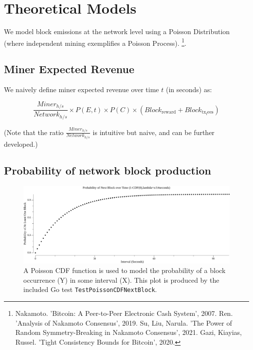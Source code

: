 \documentclass[11pt]{article}
\theoremstyle{plain}
\begin{document}

\pagebreak
\section{\normalsize{Theoretical Models}}\label{sec: theoretical-models}

We model block emissions at the network level using a Poisson Distribution
(where independent mining exemplifies a Poisson Process).\nolinebreak
\footnote{
    Nakamoto. 'Bitcoin: A Peer-to-Peer Electronic Cash System', 2007.
    Ren. 'Analysis of Nakamoto Consensus', 2019.
    Su, Liu, Narula. 'The Power of Random Symmetry-Breaking in Nakamoto Consensus', 2021.
    Gazi, Kiayias, Russel. 'Tight Consistency Bounds for Bitcoin', 2020.
}.

\subsection{\normalsize{Miner Expected Revenue}}

We naively define miner expected revenue over time $t$ (in seconds) as:

\newcommand{\minerHashrate}{Miner_{h/s}}
\newcommand{\networkHashrate}{Network_{h/s}}
\newcommand{\blockReward}{Block_\mathrm{reward}}
\newcommand{\blockTransactionFees}{Block_\mathrm{tx_fees}}

\begin{equation}
\frac{\minerHashrate}{\networkHashrate}
\times
P(E,t)
\times
P(C)
\times
(\blockReward + \blockTransactionFees)
\end{equation}

(Note that the ratio $\frac{\minerHashrate}{\networkHashrate}$ is intuitive but
naive, and can be further developed.)

\subsection{\normalsize{Probability of network block production}}

\begin{figure}[htp]
    \label{go-block-step-cdf-interval}
    \centering
    \includegraphics[width=1.0\textwidth]{go-block-step/out/vis_poisson_cdf_next_in_interval.png}
    \caption{
        A Poisson CDF function is used to model the probability of a block
        occurrence (Y) in some interval (X).
        This plot is produced by the included Go test
        \texttt{TestPoissonCDFNextBlock}.
    }
\end{figure}
\end{document}
